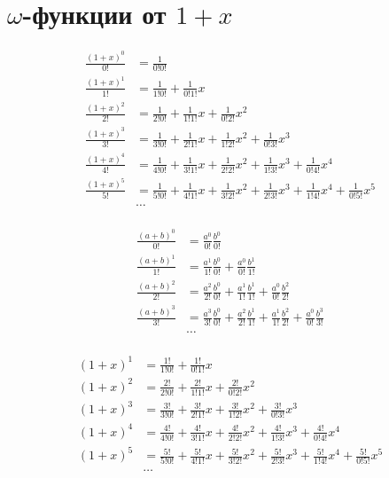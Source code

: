 
\section{$\omega$-функции от $1 + x$}

\begin{equation*}
\begin{aligned}
\frac{(1 + x)^0}{0!} &=
  \frac{1}{0!0!} 
\\
\frac{(1 + x)^1}{1!} &=
  \frac{1}{1!0!} 
+ \frac{1}{0!1!} x
\\
\frac{(1 + x)^2}{2!} &= 
  \frac{1}{2!0!} 
+ \frac{1}{1!1!} x 
+ \frac{1}{0!2!} x^2
\\
\frac{(1 + x)^3}{3!} &=
  \frac{1}{3!0!} 
+ \frac{1}{2!1!} x 
+ \frac{1}{1!2!} x^2 
+ \frac{1}{0!3!} x^3
\\
\frac{(1 + x)^4}{4!} &=
  \frac{1}{4!0!} 
+ \frac{1}{3!1!} x 
+ \frac{1}{2!2!} x^2 
+ \frac{1}{1!3!} x^3 
+ \frac{1}{0!4!} x^4
\\
\frac{(1 + x)^5}{5!} &=
  \frac{1}{5!0!} 
+ \frac{1}{4!1!} x 
+ \frac{1}{3!2!} x^2 
+ \frac{1}{2!3!} x^3 
+ \frac{1}{1!4!} x^4
+ \frac{1}{0!5!} x^5
\\
&\ldots
\\
\end{aligned}
\end{equation*}

\begin{equation*}\begin{aligned}
\frac{(a + b)^0}{0!} &=
  \frac{a^0}{0!}\frac{b^0}{0!} 
\\
\frac{(a + b)^1}{1!} &=
  \frac{a^1}{1!}\frac{b^0}{0!} 
+ \frac{a^0}{0!}\frac{b^1}{1!}
\\
\frac{(a + b)^2}{2!} &=
  \frac{a^2}{2!}\frac{b^0}{0!}
+ \frac{a^1}{1!}\frac{b^1}{1!}
+ \frac{a^0}{0!}\frac{b^2}{2!}
\\
\frac{(a + b)^3}{3!} &=
  \frac{a^3}{3!}\frac{b^0}{0!}
+ \frac{a^2}{2!}\frac{b^1}{1!}
+ \frac{a^1}{1!}\frac{b^2}{2!}
+ \frac{a^0}{0!}\frac{b^3}{3!}
\\
&\ldots \\
\end{aligned}\end{equation*}

\begin{equation*}
\begin{aligned}
(1 + x)^1 &=
  \frac{1!}{1!0!} 
+ \frac{1!}{0!1!} x
\\
(1 + x)^2 &= 
  \frac{2!}{2!0!} 
+ \frac{2!}{1!1!} x 
+ \frac{2!}{0!2!} x^2
\\
(1 + x)^3 &=
  \frac{3!}{3!0!} 
+ \frac{3!}{2!1!} x 
+ \frac{3!}{1!2!} x^2 
+ \frac{3!}{0!3!} x^3
\\
(1 + x)^4 &=
  \frac{4!}{4!0!} 
+ \frac{4!}{3!1!} x 
+ \frac{4!}{2!2!} x^2 
+ \frac{4!}{1!3!} x^3 
+ \frac{4!}{0!4!} x^4
\\
(1 + x)^5 &=
  \frac{5!}{5!0!} 
+ \frac{5!}{4!1!} x 
+ \frac{5!}{3!2!} x^2 
+ \frac{5!}{2!3!} x^3 
+ \frac{5!}{1!4!} x^4
+ \frac{5!}{0!5!} x^5
\\
&\ldots
\\
\end{aligned}
\end{equation*}

